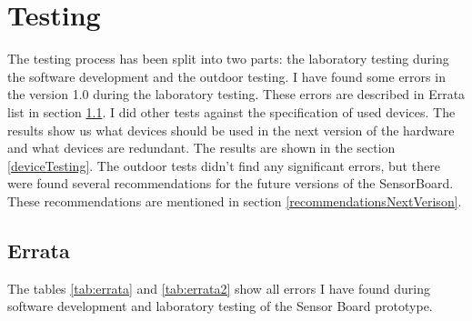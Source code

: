 \section{Testing}
\label{HWtesting}
The testing process has been split into two parts: the laboratory testing during the software development and the outdoor testing. I have found some errors in the version 1.0 during the laboratory testing. These errors are described in Errata list in section \ref{errata}. I did other tests against the specification of used devices. The results show us what devices should be used in the next version of the hardware and what devices are redundant. The results are shown in the section \ref{deviceTesting}. The outdoor tests didn't find any significant errors, but there were found several recommendations for the future versions of the SensorBoard. These recommendations are mentioned in section \ref{recommendationsNextVerison}.

\subsection{Errata}
\label{errata}
The tables \ref{tab:errata} and \ref{tab:errata2} show all errors I have found during software development and laboratory testing of the Sensor Board prototype.

